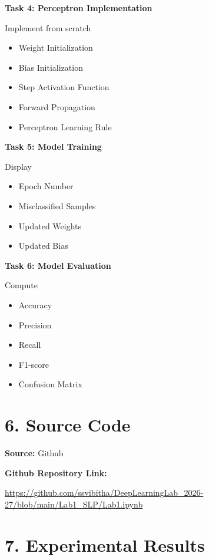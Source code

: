 \documentclass[11pt]{article}
\begin{document}
\vspace{2mm}

\textbf{Task 4: Perceptron Implementation}

Implement from scratch

\begin{itemize}
\item Weight Initialization
\item Bias Initialization
\item Step Activation Function
\item Forward Propagation
\item Perceptron Learning Rule
\end{itemize}

\vspace{2mm}

\textbf{Task 5: Model Training}

Display

\begin{itemize}
\item Epoch Number
\item Misclassified Samples
\item Updated Weights
\item Updated Bias
\end{itemize}

\vspace{2mm}

\textbf{Task 6: Model Evaluation}

Compute

\begin{itemize}
\item Accuracy
\item Precision
\item Recall
\item F1-score
\item Confusion Matrix
\end{itemize}

\section*{6. Source Code}

\textbf{Source:} Github

\textbf{Github Repository Link:}

\url{https://github.com/ssvibitha/DeepLearningLab_2026-27/blob/main/Lab1_SLP/Lab1.ipynb}
\section*{7. Experimental Results}
\end{document}
